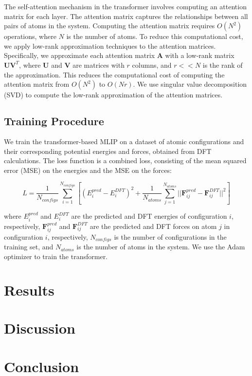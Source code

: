 \documentclass{article}
\begin{document}
The self-attention mechanism in the transformer involves computing an attention matrix for each layer. The attention matrix captures the relationships between all pairs of atoms in the system. Computing the attention matrix requires $O(N^2)$ operations, where $N$ is the number of atoms. To reduce this computational cost, we apply low-rank approximation techniques to the attention matrices. Specifically, we approximate each attention matrix $\mathbf{A}$ with a low-rank matrix $\mathbf{U}\mathbf{V}^T$, where $\mathbf{U}$ and $\mathbf{V}$ are matrices with $r$ columns, and $r << N$ is the rank of the approximation. This reduces the computational cost of computing the attention matrix from $O(N^2)$ to $O(Nr)$. We use singular value decomposition (SVD) to compute the low-rank approximation of the attention matrices.

\subsection{Training Procedure}

We train the transformer-based MLIP on a dataset of atomic configurations and their corresponding potential energies and forces, obtained from DFT calculations. The loss function is a combined loss, consisting of the mean squared error (MSE) on the energies and the MSE on the forces:

\begin{equation}
    L = \frac{1}{N_{configs}} \sum_{i=1}^{N_{configs}} \left[ (E_i^{pred} - E_i^{DFT})^2 + \frac{1}{N_{atoms}} \sum_{j=1}^{N_{atoms}} ||\mathbf{F}_{ij}^{pred} - \mathbf{F}_{ij}^{DFT}||^2 \right]
\end{equation}

where $E_i^{pred}$ and $E_i^{DFT}$ are the predicted and DFT energies of configuration $i$, respectively, $\mathbf{F}_{ij}^{pred}$ and $\mathbf{F}_{ij}^{DFT}$ are the predicted and DFT forces on atom $j$ in configuration $i$, respectively, $N_{configs}$ is the number of configurations in the training set, and $N_{atoms}$ is the number of atoms in the system. We use the Adam optimizer to train the transformer.

\section{Results}
\section{Discussion}
\section{Conclusion}



\end{document}
